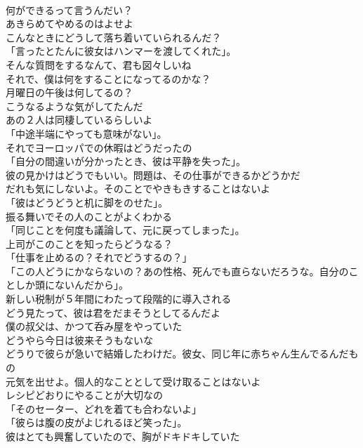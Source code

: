\documentclass[8pt]{extreport}
\begin{document}
\begin{CJK}{UTF8}{min}
\\	何ができるって言うんだい？	
\\	あきらめてやめるのはよせよ	
\\	こんなときにどうして落ち着いていられるんだ？	
\\	「言ったとたんに彼女はハンマーを渡してくれた」。	
\\	そんな質問をするなんて、君も図々しいね	
\\	それで、僕は何をすることになってるのかな？	
\\	月曜日の午後は何してるの？	
\\	[どうせ]こうなるような気がしてたんだ	
\\	あの２人は同棲しているらしいよ	
\\	「中途半端にやっても意味がない」。	
\\	それでヨーロッパでの休暇はどうだったの	
\\	「自分の間違いが分かったとき、彼は平静を失った」。	
\\	彼の見かけはどうでもいい。問題は、その仕事ができるかどうかだ	
\\	だれも気にしないよ。そのことでやきもきすることはないよ	
\\	「彼はどうどうと机に脚をのせた」。	
\\	振る舞いでその人のことがよくわかる	
\\	「同じことを何度も議論して、元に戻ってしまった」。	
\\	上司がこのことを知ったらどうなる？	
\\	「仕事を止めるの？それでどうするの？」	
\\	「この人どうにかならないの？あの性格、死んでも直らないだろうな。自分のことしか頭にないんだから」。	
\\	新しい税制が５年間にわたって段階的に導入される	
\\	どう見たって、彼は君をだまそうとしてるんだよ	
\\	僕の叔父は、かつて呑み屋をやっていた	
\\	どうやら今日は彼来そうもないな	
\\	どうりで彼らが急いで結婚したわけだ。彼女、同じ年に赤ちゃん生んでるんだもの	
\\	元気を出せよ。個人的なこととして受け取ることはないよ	
\\	レシピどおりにやることが大切なの	
\\	「そのセーター、どれを着ても合わないよ」	
\\	「彼らは腹の皮がよじれるほど笑った」。	
\\	彼はとても興奮していたので、胸がドキドキしていた	

\end{CJK}
\end{document}
